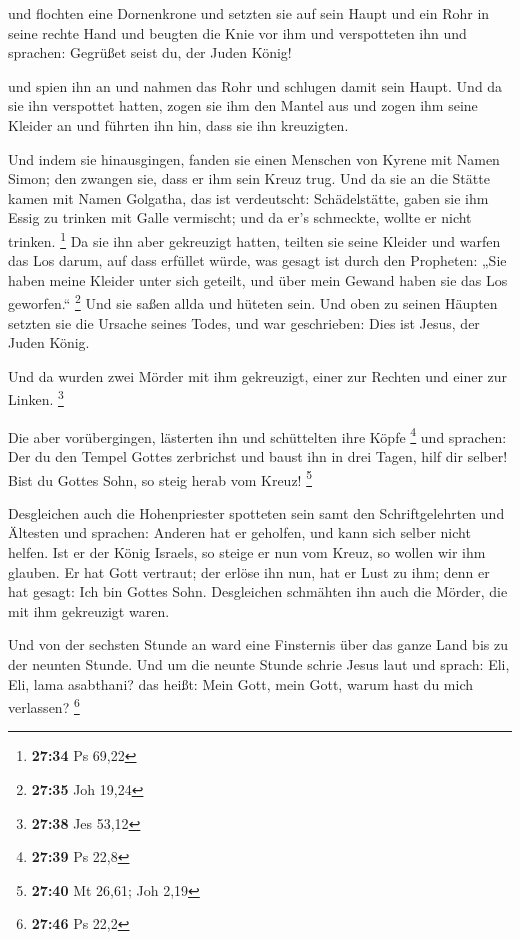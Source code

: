  und flochten eine Dornenkrone und setzten sie auf sein
Haupt und ein Rohr in seine rechte Hand und beugten die Knie vor ihm und
verspotteten ihn und sprachen: Gegrüßet seist du, der Juden König!

 und spien ihn an und nahmen das Rohr und schlugen damit
sein Haupt.  Und da sie ihn verspottet hatten, zogen sie
ihm den Mantel aus und zogen ihm seine Kleider an und führten ihn hin,
dass sie ihn kreuzigten.

 Und indem sie hinausgingen, fanden sie einen Menschen von
Kyrene mit Namen Simon; den zwangen sie, dass er ihm sein Kreuz trug.
 Und da sie an die Stätte kamen mit Namen Golgatha, das ist
verdeutscht: Schädelstätte,  gaben sie ihm Essig zu trinken
mit Galle vermischt; und da er's schmeckte, wollte er nicht trinken.
\footnote{\textbf{27:34} Ps 69,22}  Da sie ihn aber
gekreuzigt hatten, teilten sie seine Kleider und warfen das Los darum,
auf dass erfüllet würde, was gesagt ist durch den Propheten: „Sie haben
meine Kleider unter sich geteilt, und über mein Gewand haben sie das Los
geworfen.`` \footnote{\textbf{27:35} Joh 19,24}  Und sie
saßen allda und hüteten sein.  Und oben zu seinen Häupten
setzten sie die Ursache seines Todes, und war geschrieben: Dies ist
Jesus, der Juden König.

 Und da wurden zwei Mörder mit ihm gekreuzigt, einer zur
Rechten und einer zur Linken. \footnote{\textbf{27:38} Jes 53,12}

 Die aber vorübergingen, lästerten ihn und schüttelten ihre
Köpfe \footnote{\textbf{27:39} Ps 22,8}  und sprachen: Der
du den Tempel Gottes zerbrichst und baust ihn in drei Tagen, hilf dir
selber! Bist du Gottes Sohn, so steig herab vom Kreuz! \footnote{\textbf{27:40}
  Mt 26,61; Joh 2,19}

 Desgleichen auch die Hohenpriester spotteten sein samt den
Schriftgelehrten und Ältesten und sprachen:  Anderen hat er
geholfen, und kann sich selber nicht helfen. Ist er der König Israels,
so steige er nun vom Kreuz, so wollen wir ihm glauben.  Er
hat Gott vertraut; der erlöse ihn nun, hat er Lust zu ihm; denn er hat
gesagt: Ich bin Gottes Sohn.  Desgleichen schmähten ihn
auch die Mörder, die mit ihm gekreuzigt waren.

 Und von der sechsten Stunde an ward eine Finsternis über
das ganze Land bis zu der neunten Stunde.  Und um die
neunte Stunde schrie Jesus laut und sprach: Eli, Eli, lama asabthani?
das heißt: Mein Gott, mein Gott, warum hast du mich verlassen?
\footnote{\textbf{27:46} Ps 22,2}

